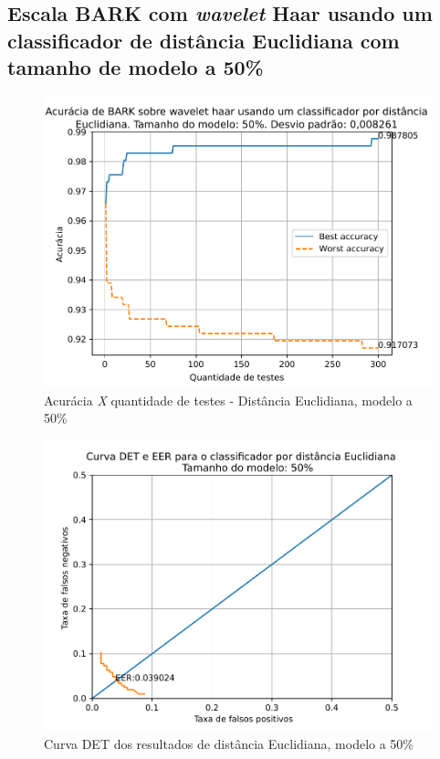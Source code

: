 			\FloatBarrier
		\subsection{Escala BARK com \textit{wavelet} Haar usando um classificador de distância Euclidiana com tamanho de modelo a 50\%}
		
			
			
			\begin{figure}[!ht]
				\centering
				\includegraphics[width=\linewidth]{images/results/confusionMatrices/classifier_Euclidian_50}
				\caption{Acurácia \textit{X} quantidade de testes - Distância Euclidiana, modelo a 50\%}
				\label{fig:classifiereuclidian50}
			\end{figure}
		
			\begin{figure}[!h]
				\centering
				\includegraphics[width=.9\linewidth]{images/results/det/DET_for_classifier_Euclidian_50}
				\caption{Curva DET dos resultados de distância Euclidiana, modelo a 50\%}
				\label{fig:detforclassifiereuclidian50}
			\end{figure}
		
